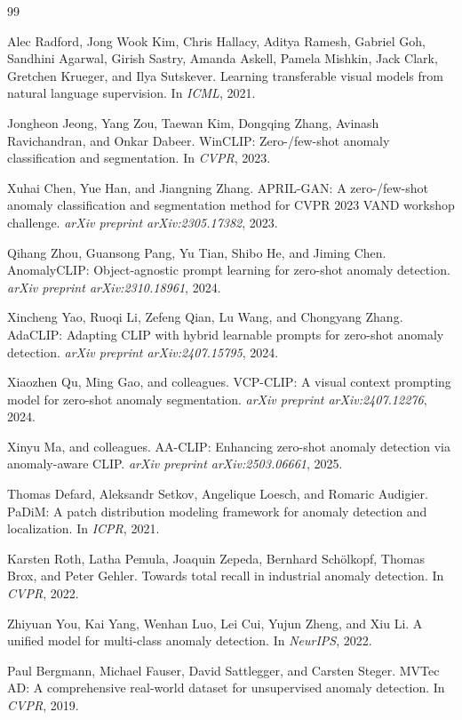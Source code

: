 \documentclass[UTF8,11pt,a4paper,fontset=none]{ctexart}
\begin{document}
\begin{thebibliography}{99}

Alec Radford, Jong Wook Kim, Chris Hallacy, Aditya Ramesh, Gabriel Goh, Sandhini Agarwal, Girish Sastry, Amanda Askell, Pamela Mishkin, Jack Clark, Gretchen Krueger, and Ilya Sutskever.
\newblock Learning transferable visual models from natural language supervision.
\newblock In \emph{ICML}, 2021.

Jongheon Jeong, Yang Zou, Taewan Kim, Dongqing Zhang, Avinash Ravichandran, and Onkar Dabeer.
\newblock WinCLIP: Zero-/few-shot anomaly classification and segmentation.
\newblock In \emph{CVPR}, 2023.

Xuhai Chen, Yue Han, and Jiangning Zhang.
\newblock APRIL-GAN: A zero-/few-shot anomaly classification and segmentation method for CVPR 2023 VAND workshop challenge.
\newblock \emph{arXiv preprint arXiv:2305.17382}, 2023.

Qihang Zhou, Guansong Pang, Yu Tian, Shibo He, and Jiming Chen.
\newblock AnomalyCLIP: Object-agnostic prompt learning for zero-shot anomaly detection.
\newblock \emph{arXiv preprint arXiv:2310.18961}, 2024.

Xincheng Yao, Ruoqi Li, Zefeng Qian, Lu Wang, and Chongyang Zhang.
\newblock AdaCLIP: Adapting CLIP with hybrid learnable prompts for zero-shot anomaly detection.
\newblock \emph{arXiv preprint arXiv:2407.15795}, 2024.

Xiaozhen Qu, Ming Gao, and colleagues.
\newblock VCP-CLIP: A visual context prompting model for zero-shot anomaly segmentation.
\newblock \emph{arXiv preprint arXiv:2407.12276}, 2024.

Xinyu Ma, and colleagues.
\newblock AA-CLIP: Enhancing zero-shot anomaly detection via anomaly-aware CLIP.
\newblock \emph{arXiv preprint arXiv:2503.06661}, 2025.

Thomas Defard, Aleksandr Setkov, Angelique Loesch, and Romaric Audigier.
\newblock PaDiM: A patch distribution modeling framework for anomaly detection and localization.
\newblock In \emph{ICPR}, 2021.

Karsten Roth, Latha Pemula, Joaquin Zepeda, Bernhard Schölkopf, Thomas Brox, and Peter Gehler.
\newblock Towards total recall in industrial anomaly detection.
\newblock In \emph{CVPR}, 2022.

Zhiyuan You, Kai Yang, Wenhan Luo, Lei Cui, Yujun Zheng, and Xiu Li.
\newblock A unified model for multi-class anomaly detection.
\newblock In \emph{NeurIPS}, 2022.

Paul Bergmann, Michael Fauser, David Sattlegger, and Carsten Steger.
\newblock MVTec AD: A comprehensive real-world dataset for unsupervised anomaly detection.
\newblock In \emph{CVPR}, 2019.

\end{thebibliography}
\end{document}
